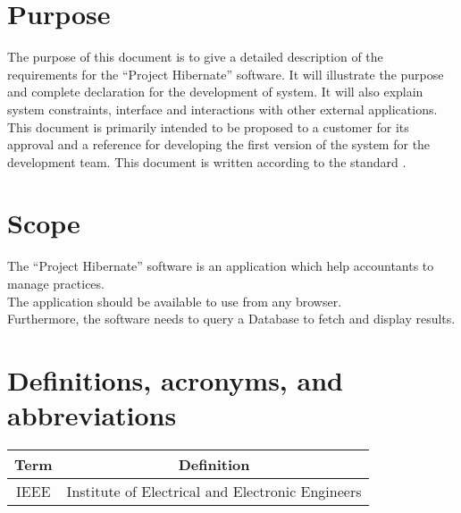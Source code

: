 \documentclass[../main.tex]{subfiles}
\begin{document}
	\section{Purpose}
		The purpose of this document is to give a detailed description of the requirements for the ``Project Hibernate'' software. It will illustrate the purpose and complete declaration for the development of system. It will also explain system constraints, interface and interactions with other external applications. This document is primarily intended to be proposed to a customer for its approval and a reference for developing the first version of the system for the development team. This document is written according to the standard \citep{IEEE830}.

	\section{Scope}
		The ``Project Hibernate'' software is an application which help accountants to manage practices.\\
		The application should be available to use from any browser.\\
		Furthermore, the software needs to query a Database to fetch and display results.

	\section{Definitions, acronyms, and abbreviations}
		\begin{tabular}{|c|c|}
    		\hline
    		Term & Definition  \\
    		\hline
     		IEEE & Institute of Electrical and Electronic Engineers \\ 
    		\hline
		\end{tabular}
\end{document}

